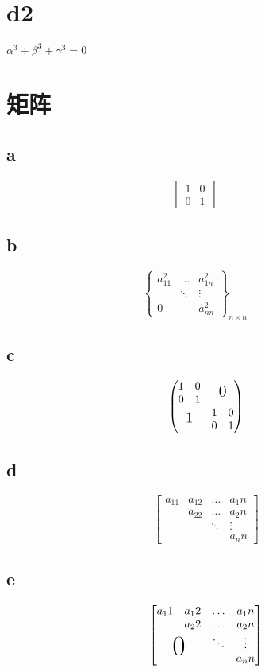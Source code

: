 \documentclass{article}
\begin{document}
	\section{d2}
	$\alpha^3 + \beta^3 + \gamma^3 = 0$ 
	\section{矩阵}
	\subsection{a}
	\[
	\begin{vmatrix}		%
		1 & 0 \\
		0 & 1
	\end{vmatrix} \qquad
	\]
	\subsection{b}
	\[
	\begin{Bmatrix}
		a_{11}^2 & \dots & a_{1n}^2\\
		         & \ddots & \vdots\\
		0        & & a_{nn}^2
	\end{Bmatrix}_{n \times n}	 \qquad
	\]
	\subsection{c}
	\[
	\begin{pmatrix}
	\begin{matrix}
		1&0 \\
		0&1
	\end{matrix}& \text{\Large 0} \\ \text{\Large 1} &
	\begin{matrix}
		1&0 \\
		0&1
	\end{matrix}
	\end{pmatrix}
	\]
	\subsection{d}
	\[
	\begin{bmatrix}
		a_11&a_12&\dots&a_1n\\
		&a_22&\dots&a_2n\\
		& & \ddots&\vdots\\
		 & & &a_nn	
	\end{bmatrix}
	\]
	\subsection{e}
	\[
	\begin{bmatrix}
		a_11&a_12&\dots&a_1n\\
		&a_22&\dots&a_2n\\
		& & \ddots&\vdots\\
		\multicolumn{2}{c}{\raisebox{1.4ex}[1pt]{\Huge 0} }& &a_nn	
	\end{bmatrix}
	\]
\end{document}
